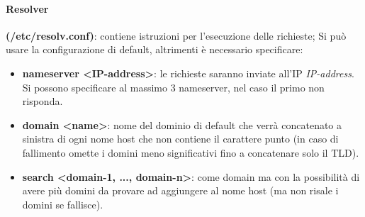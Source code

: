 \documentclass[a4paper,11pt]{article}
\begin{document}
\paragraph{Resolver} \textbf{(/etc/resolv.conf)}: contiene istruzioni per l'esecuzione delle richieste; Si può usare la configurazione di default, altrimenti è necessario specificare:
\begin{itemize}
\item \textbf{nameserver \textless IP-address\textgreater}: le richieste saranno inviate all'IP \textit{IP-address}. Si possono specificare al massimo 3 nameserver, nel caso il primo non risponda.
\item \textbf{domain \textless name\textgreater}: nome del dominio di default che verrà concatenato a sinistra di ogni nome host che non contiene il carattere punto (in caso di fallimento omette i domini meno significativi fino a concatenare solo il TLD).
\item \textbf{search \textless domain-1, ..., domain-n\textgreater}: come domain ma con la possibilità di avere più domini da provare ad aggiungere al nome host (ma non risale i domini se fallisce).
\end{itemize}
\end{document}
